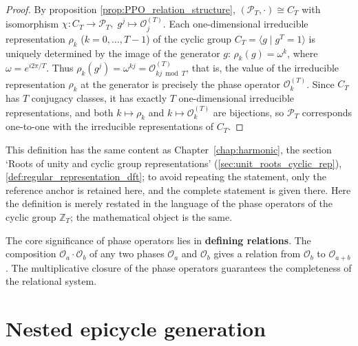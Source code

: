 \begin{proof}
By proposition \ref{prop:PPO_relation_structure}, $(\mathcal{P}_T, \cdot) \cong C_T$ with isomorphism $\chi: C_T \to \mathcal{P}_T,\; g^j \mapsto \mathcal{O}_j^{(T)}$. Each one-dimensional irreducible representation $\rho_k$ ($k = 0,\dots,T-1$) of the cyclic group $C_T = \langle g \mid g^T = 1 \rangle$ is uniquely determined by the image of the generator $g$: $\rho_k(g) = \omega^k$, where $\omega = e^{i2\pi/T}$. Thus $\rho_k(g^j) = \omega^{kj} = \mathcal{O}_{kj \bmod T}^{(T)}$, that is, the value of the irreducible representation $\rho_k$ at the generator is precisely the phase operator $\mathcal{O}_k^{(T)}$. Since $C_T$ has $T$ conjugacy classes, it has exactly $T$ one-dimensional irreducible representations, and both $k \mapsto \rho_k$ and $k \mapsto \mathcal{O}_k^{(T)}$ are bijections, so $\mathcal{P}_T$ corresponds one-to-one with the irreducible representations of $C_T$.
\end{proof}

\begin{definition}\label{def:regular_representation_yijing}
This definition has the same content as Chapter~\ref{chap:harmonic}, the section `Roots of unity and cyclic group representations' (\cref{sec:unit_roots_cyclic_rep}), \cref{def:regular_representation_dft}; to avoid repeating the statement, only the reference anchor is retained here, and the complete statement is given there. Here the definition is merely restated in the language of the phase operators of the cyclic group $\mathbb{Z}_T$; the mathematical object is the same.
\end{definition}

\begin{remark}
The core significance of phase operators lies in \textbf{defining relations}. The composition $\mathcal{O}_a \cdot \mathcal{O}_b$ of any two phases $\mathcal{O}_a$ and $\mathcal{O}_b$ gives a relation from $\mathcal{O}_b$ to $\mathcal{O}_{a+b}$. The multiplicative closure of the phase operators guarantees the completeness of the relational system.
\end{remark}

\section{Nested epicycle generation}

